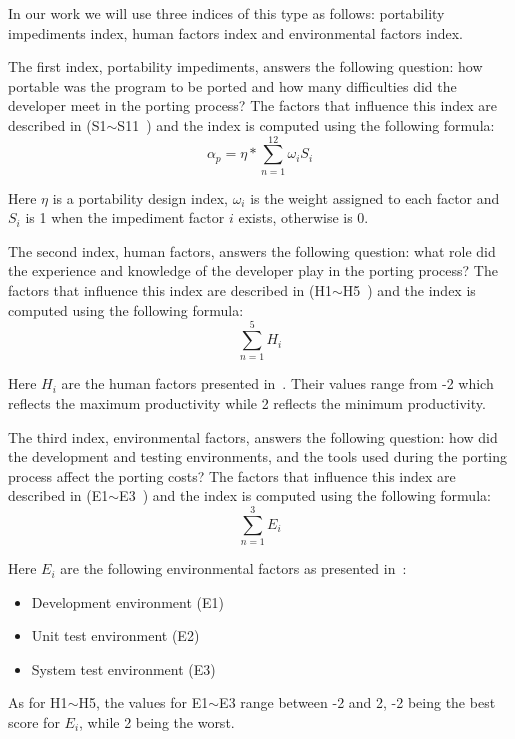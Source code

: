 In our work we will use three indices of this type as follows: portability
impediments index, human factors index and environmental factors index.

The first index, portability impediments, answers the following question: how
portable was the program to be ported and how many difficulties did the
developer meet in the porting process? The factors that influence this index are
described in (S1$\sim$S11~\cite{hakuta}) and the index is computed using the
following formula: \[ \alpha_p = \eta * \sum_{n=1}^{12} \omega_i S_i \]

Here $\eta$ is a portability design index, $\omega_i$ is the weight assigned to
each factor and $S_i$ is 1 when the impediment factor $i$ exists, otherwise is
0.

The second index, human factors, answers the following question: what role did
the experience and knowledge of the developer play in the porting process? The
factors that influence this index are described in (H1$\sim$H5~\cite{hakuta}) and
the index is computed using the following formula: \[ \sum_{n=1}^{5} H_i \]

Here $H_i$ are the human factors presented in~\cite{hakuta}. Their values range
from -2 which reflects the maximum productivity while 2 reflects the minimum
productivity.

The third index, environmental factors, answers the following question: how did
the development and testing environments, and the tools used during the porting
process affect the porting costs? The factors that influence this index are
described in (E1$\sim$E3~\cite{hakuta}) and the index is computed using the
following formula: \[ \sum_{n=1}^{3} E_i \]

Here $E_i$ are the following environmental factors as presented in~\cite{hakuta}:
\begin{itemize}
    \item Development environment (E1)
    \item Unit test environment (E2)
    \item System test environment (E3)
\end{itemize}

As for H1$\sim$H5, the values for E1$\sim$E3 range between -2 and 2, -2 being the best
score for $E_i$, while 2 being the worst.
